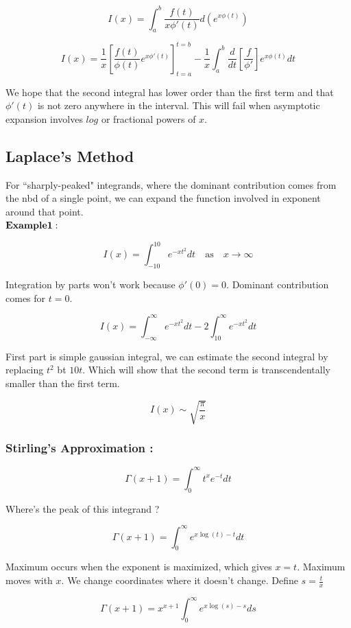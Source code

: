 \documentclass{report}
\begin{document}
$$I(x) = \int_{a}^{b} \frac{f(t)}{x\phi'(t)} d(e^{x\phi(t)})$$

$$I(x) = \frac{1}{x} \left[\frac{f(t)}{\phi(t)} e^{x\phi'(t)}\right]_{t=a}^{t=b} - \frac{1}{x}\int_{a}^{b}\frac {d}{dt}\left[\frac{f}{\phi'}\right]e^{x\phi(t)}dt $$

We hope that the second integral has lower order than the first term and that $\phi'(t)$ is not zero anywhere in the interval. This will fail when asymptotic expansion involves $log$ or fractional powers of $x$.

\subsection{Laplace's Method}

For ``sharply-peaked" integrands, where the dominant contribution comes from the nbd of a single point, we can expand the function involved in exponent around that point.\\

\noindent $\bold{Example 1 :}$

$$ I(x) = \int_{-10}^{10}e^{-xt^2}dt \quad\mathrm{as}\quad x\to\infty$$

\noindent Integration by parts won't work because $\phi'(0) = 0$. Dominant contribution comes for $t=0$. 

$$I(x) = \int_{-\infty}^{\infty}e^{-xt^2}dt - 2\int_{10}^{\infty}e^{-xt^2}dt$$

\noindent First part is simple gaussian integral, we can estimate the second integral by replacing $t^2$ bt $10t$. Which will show that the second term is transcendentally smaller than the first term.

$$I(x) \sim \sqrt{\frac{\pi}{x}}$$

\subsubsection{Stirling's Approximation :}

$$\Gamma(x+1) = \int_{0}^{\infty}t^x e^{-t}dt$$

\noindent Where's the peak of this integrand ? 

$$ \Gamma(x+1) = \int_{0}^{\infty}e^{x\log(t)-t}dt$$

\noindent Maximum occurs when the exponent is maximized, which gives $x = t$. Maximum moves with $x$. We change coordinates where it doesn't change. Define $ s = \frac{t}{x}$

$$\Gamma(x+1) = x^{x+1}\int_{0}^{\infty}e^{x\log(s) - s}ds$$
\end{document}
